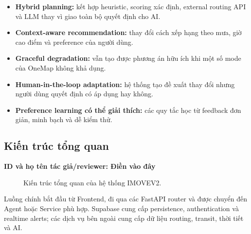 \documentclass[12pt,a4paper]{article}
\newcommand{\tacgia}{%
  \begin{tcolorbox}[colback=blue!3,colframe=blue!25,boxrule=0.4pt,arc=1mm]
    \small\textbf{ID và họ tên tác giả/reviewer: Điền vào đây}
  \end{tcolorbox}
}
\begin{document}
\begin{itemize}
    \item \textbf{Hybrid planning:} kết hợp heuristic, scoring xác định, external routing API và LLM thay vì giao toàn bộ quyết định cho AI.
    \item \textbf{Context-aware recommendation:} thay đổi cách xếp hạng theo mưa, giờ cao điểm và preference của người dùng.
    \item \textbf{Graceful degradation:} vẫn tạo được phương án hữu ích khi một số mode của OneMap không khả dụng.
    \item \textbf{Human-in-the-loop adaptation:} hệ thống tạo đề xuất thay đổi nhưng người dùng quyết định có áp dụng hay không.
    \item \textbf{Preference learning có thể giải thích:} các quy tắc học từ feedback đơn giản, minh bạch và dễ kiểm thử.
\end{itemize}

\subsection{Kiến trúc tổng quan}
\tacgia

\begin{figure}[H]
\centering
{}
\caption{Kiến trúc tổng quan của hệ thống IMOVEV2.}
\label{fig:architecture}
\end{figure}

Luồng chính bắt đầu từ Frontend, đi qua các FastAPI router và được chuyển đến Agent hoặc Service phù hợp. Supabase cung cấp persistence, authentication và realtime alerts; các dịch vụ bên ngoài cung cấp dữ liệu routing, transit, thời tiết và AI.
\end{document}
